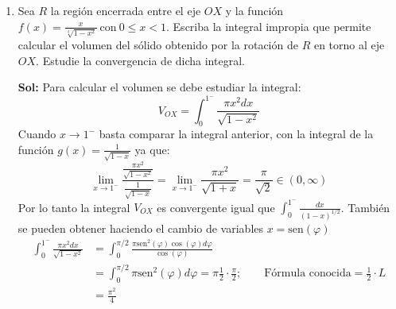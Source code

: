 \documentclass[letterpaper,12pt]{article}
\theoremstyle{plain}
\theoremstyle{definition}
\newcommand{\sen}{\text{sen}}
\begin{document}
\begin{enumerate}
\begin{enumerate}
\color{blue}
\textbf{Sol:} La integral diverge igual que $\displaystyle \int_1^\infty \frac{dx}{x}$ ya que
\[
\lim_{x\to\infty} \frac{\frac{1+x}{1+x^2}}{1/x} = \lim_{x\to\infty} \frac{x + x^2}{1 + x^2} = 1 \neq 0.
\]
\color{black}
    
    \item $\displaystyle \int_0^1 \frac{\ln(x)}{\sqrt{x}} \, dx$

\color{blue}
\textbf{Sol:} Tomamos $a \in (0, 1)$ y usando integración por partes obtenemos
\begin{align*}
\int_{a}^{1} \frac{\ln(x)}{\sqrt{x}} \, dx &= \frac{2}{3} x^{3/2} \ln(x) \bigg|_{a}^{1} - \int_{a}^{1} \frac{2}{3} x^{3/2} \frac{1}{x} \, dx \\
&= -\frac{2}{3} a^{3/2} \ln(a) - \frac{2}{3} \int_{a}^{1} x^{1/2} \, dx \\
&= -\frac{2}{3} a^{3/2} \ln(a) - \frac{2}{3} \frac{2}{3} x^{3/2} \bigg|_{a}^{1} \\
&= -\frac{2}{3} a^{3/2} \ln(a) - \frac{4}{9} (1 - a^{3/2}).
\end{align*}
Usando L'Hopital se prueba que la primera parte converge a 0, por lo que la integral impropia es convergente y vale $-\frac{4}{9}$.
\color{black}

    
\end{enumerate}

\item  Sea \( R \) la región encerrada entre el eje \( OX \) y la función 
$
\displaystyle f(x) = \frac{x}{\sqrt[4]{1 - x^2}} \ \text{con} \ 0 \leq x < 1.
$
Escriba la integral impropia que permite calcular el volumen del sólido obtenido por la rotación de \( R \) en torno al eje \( OX \). Estudie la convergencia de dicha integral.

\color{blue}
\textbf{Sol:} Para calcular el volumen se debe estudiar la integral:
\[
V_{OX} = \int_0^{1^-} \frac{\pi x^2 dx}{\sqrt{1-x^2}}
\]
\noindent Cuando $x \to 1^-$ basta comparar la integral anterior, con la integral de la función $g(x) = \frac{1}{\sqrt{1-x}}$ ya que:
\[
\lim_{x\to 1^-} \frac{\frac{\pi x^2}{\sqrt{1-x^2}}}{\frac{1}{\sqrt{1-x}}} = \lim_{x\to 1^-} \frac{\pi x^2}{\sqrt{1+x}} = \frac{\pi}{\sqrt{2}} \in (0, \infty)
\]
Por lo tanto la integral $V_{OX}$ es convergente igual que $\displaystyle \int_0^{1^-} \frac{dx}{(1-x)^{1/2}}$.
 También  se pueden obtener haciendo el cambio de variables $x = \sen(\varphi)$
\begin{align*}
\int_0^{1^-} \frac{\pi x^2 dx}{\sqrt{1-x^2}} &= \int_0^{\pi/2} \frac{\pi \sen^2(\varphi) \cos(\varphi) d\varphi}{\cos(\varphi)} \\[1em]
&= \int_0^{\pi/2} \pi \sen^2(\varphi) d\varphi = \pi \frac{1}{2} \cdot \frac{\pi}{2}; \qquad \text{Fórmula conocida} = \frac{1}{2} \cdot L \\[1em]
&= \frac{\pi^2}{4}
\end{align*}
\color{black}


\end{enumerate}
\end{document}
